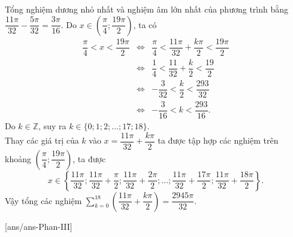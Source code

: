 \begin{ex}
{\begin{itemchoice}
			Tổng nghiệm dương nhỏ nhất và nghiệm âm lớn nhất của phương trình bằng $\dfrac{11\pi}{32}-\dfrac{5\pi}{32}=\dfrac{3\pi}{16}$.
			\itemch
			Do $x\in\left(\dfrac{\pi}{4};\dfrac{19\pi}{2}\right)$, ta có 
			\allowdisplaybreaks
			\begin{eqnarray*}
				\dfrac{\pi}{4}<x<\dfrac{19\pi}{2}
				&\Leftrightarrow& \dfrac{\pi}{4}<\dfrac{11\pi}{32}+\dfrac{k\pi}{2}<\dfrac{19\pi}{2}\\
				&\Leftrightarrow& \dfrac{1}{4}<\dfrac{11}{32}+\dfrac{k}{2}<\dfrac{19}{2}\\
				&\Leftrightarrow&-\dfrac{3}{32}<\dfrac{k}{2}<\dfrac{293}{32}\\
				&\Leftrightarrow&-\dfrac{3}{16}<k<\dfrac{293}{16}.
			\end{eqnarray*}
			Do $k\in \mathbb{Z}$, suy ra $k\in\{0;1;2;\ldots;17;18\}$.\\
			Thay các giá trị của $k$ vào $x=\dfrac{11\pi}{32}+\dfrac{k\pi}{2}$ ta được tập hợp các nghiệm trên khoảng $\left(\dfrac{\pi}{4};\dfrac{19\pi}{2}\right)$, ta được
			$$x\in\left\{\dfrac{11\pi}{32};\dfrac{11\pi}{32}+\dfrac{\pi}{2};\dfrac{11\pi}{32}+\dfrac{2\pi}{2};\ldots;\dfrac{11\pi}{32}+\dfrac{17\pi}{2};\dfrac{11\pi}{32}+\dfrac{18\pi}{2}\right\}.$$
			Vậy tổng các nghiệm  $\sum_{k=0}^{18}\left(\dfrac{11\pi}{32}+\dfrac{k\pi}{2}\right)=\dfrac{2945\pi}{32}$.		
		\end{itemchoice}
	}
\end{ex}
\caukq
{}[ans/ans\currfilebase-Phan-III]
